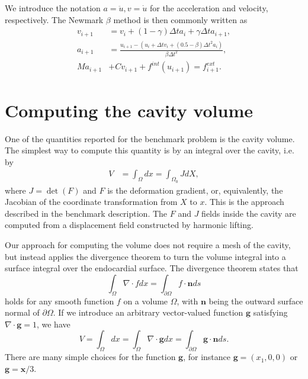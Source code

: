 \documentclass[a4paper,10pt]{article}
\begin{document}
We introduce the notation $a= \ddot{u}, v=\dot{u}$
for the acceleration and velocity, respectively. The Newmark $\beta$ method
is then commonly written as
\begin{align}
v_{i+1} &= v_i + (1-\gamma) \Delta t a_i + \gamma \Delta t a_{i+1}, \\
a_{i+1} &= \frac{u_{i+1} - (u_i + \Delta t v_i + (0.5 - \beta) \Delta t^2 a_i)}{\beta \Delta t^2}, \\
Ma_{i+1} &+ C v_{i+1} + f^{int}(u_{i+1}) = f^{ext}_{i+1} .
\end{align}







\section{Computing the cavity volume}
One of the quantities reported for the benchmark problem is the cavity volume.
The simplest way to compute this quantity is by an integral over the cavity, i.e.
by
\begin{align}
V &= \int_\Omega dx = \int_{\Omega_0} J dX,
\label{vol0}\end{align}
where $J=\det(F)$ and $F$ is the deformation gradient, or,
equivalently, the Jacobian of the coordinate transformation from $X$
to $x$. This is the approach described in the benchmark description.
The $F$ and $J$ fields inside the cavity are computed from a displacement field
constructed by harmonic lifting.

Our approach for computing the volume does not require a mesh of the cavity,
but instead applies the divergence theorem to turn the volume integral into
a surface integral over the endocardial surface. The divergence theorem states
that
\[
\int_\Omega \nabla\cdot f dx = \int_{\partial\Omega} f\cdot \mathbf{n} ds
\]
holds for any smooth function $f$ on a volume $\Omega$, with $\mathbf{n}$ being the
outward surface normal of $\partial\Omega$. If we introduce an
arbitrary vector-valued function $\mathbf{g}$ satisfying $\nabla\cdot \mathbf{g} = 1$, we have
\[
V =\int_{\Omega} dx = \int_{\Omega}\nabla\cdot \mathbf{g}dx
= \int_{\partial\Omega}\mathbf{g}\cdot\mathbf{n}ds .
\]
There are many simple choices for the function $\mathbf{g}$, for instance $\mathbf{g}=(x_1,0,0)$ or
$\mathbf{g}=\mathbf{x}/3$.
\end{document}
